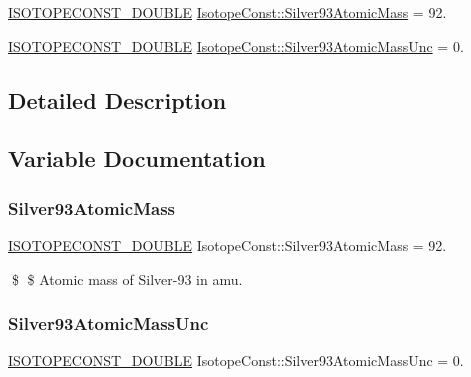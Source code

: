 \begin{DoxyCompactItemize}
\item 
\mbox{\hyperlink{group___isotope_const-_macros_ga8f45a7272ce02c0b4c65c44636ed719a}{I\+S\+O\+T\+O\+P\+E\+C\+O\+N\+S\+T\+\_\+\+D\+O\+U\+B\+LE}} \mbox{\hyperlink{group___isotope_const-_silver-_ag93_ga8c4a366be6028a7c7aba9a08d5520788}{Isotope\+Const\+::\+Silver93\+Atomic\+Mass}} = 92.
\item 
\mbox{\hyperlink{group___isotope_const-_macros_ga8f45a7272ce02c0b4c65c44636ed719a}{I\+S\+O\+T\+O\+P\+E\+C\+O\+N\+S\+T\+\_\+\+D\+O\+U\+B\+LE}} \mbox{\hyperlink{group___isotope_const-_silver-_ag93_ga851a8afaf8f9b828cdd3099f1fb34993}{Isotope\+Const\+::\+Silver93\+Atomic\+Mass\+Unc}} = 0.
\end{DoxyCompactItemize}


\subsection{Detailed Description}


\subsection{Variable Documentation}
\mbox{\label{group___isotope_const-_silver-_ag93_ga8c4a366be6028a7c7aba9a08d5520788}} 
\subsubsection{\texorpdfstring{Silver93\+Atomic\+Mass}{Silver93AtomicMass}}
{\footnotesize\ttfamily \mbox{\hyperlink{group___isotope_const-_macros_ga8f45a7272ce02c0b4c65c44636ed719a}{I\+S\+O\+T\+O\+P\+E\+C\+O\+N\+S\+T\+\_\+\+D\+O\+U\+B\+LE}} Isotope\+Const\+::\+Silver93\+Atomic\+Mass = 92.}

\$ \$ Atomic mass of Silver-\/93 in amu. \mbox{\label{group___isotope_const-_silver-_ag93_ga851a8afaf8f9b828cdd3099f1fb34993}} 
\subsubsection{\texorpdfstring{Silver93\+Atomic\+Mass\+Unc}{Silver93AtomicMassUnc}}
{\footnotesize\ttfamily \mbox{\hyperlink{group___isotope_const-_macros_ga8f45a7272ce02c0b4c65c44636ed719a}{I\+S\+O\+T\+O\+P\+E\+C\+O\+N\+S\+T\+\_\+\+D\+O\+U\+B\+LE}} Isotope\+Const\+::\+Silver93\+Atomic\+Mass\+Unc = 0.}

